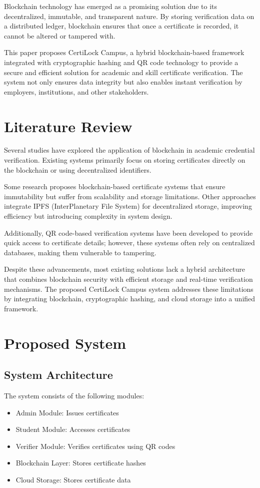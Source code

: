 \documentclass[conference]{IEEEtran}
\begin{document}
Blockchain technology has emerged as a promising solution due to its decentralized, immutable, and transparent nature. By storing verification data on a distributed ledger, blockchain ensures that once a certificate is recorded, it cannot be altered or tampered with.

This paper proposes CertiLock Campus, a hybrid blockchain-based framework integrated with cryptographic hashing and QR code technology to provide a secure and efficient solution for academic and skill certificate verification. The system not only ensures data integrity but also enables instant verification by employers, institutions, and other stakeholders.

\section{Literature Review}
Several studies have explored the application of blockchain in academic credential verification. Existing systems primarily focus on storing certificates directly on the blockchain or using decentralized identifiers.

Some research proposes blockchain-based certificate systems that ensure immutability but suffer from scalability and storage limitations. Other approaches integrate IPFS (InterPlanetary File System) for decentralized storage, improving efficiency but introducing complexity in system design.

Additionally, QR code-based verification systems have been developed to provide quick access to certificate details; however, these systems often rely on centralized databases, making them vulnerable to tampering.

Despite these advancements, most existing solutions lack a hybrid architecture that combines blockchain security with efficient storage and real-time verification mechanisms. The proposed CertiLock Campus system addresses these limitations by integrating blockchain, cryptographic hashing, and cloud storage into a unified framework.

\section{Proposed System}

\subsection{System Architecture}

The system consists of the following modules:
\begin{itemize}
\item Admin Module: Issues certificates
\item Student Module: Accesses certificates
\item Verifier Module: Verifies certificates using QR codes
\item Blockchain Layer: Stores certificate hashes
\item Cloud Storage: Stores certificate data
\end{itemize}
\end{document}

